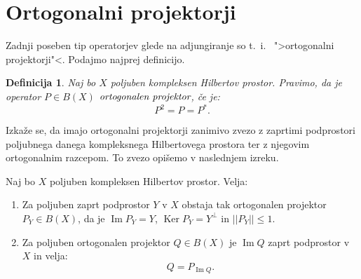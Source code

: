 \documentclass[12pt,a4paper,oneside,fleqn,openany]{book}
\newtheorem{definicija}[izrek]{Definicija}
\newcommand{\abs}[1]{\ensuremath{\lvert #1 \rvert}}
\newcommand{\norm}[1]{\abs{\abs{#1}}}
\newcommand{\pojem}[1]{\ensuremath{\emph{#1}}}
\begin{document}
\section[Ortogonalni projektorji]{Ortogonalni projektorji}
Zadnji poseben tip operatorjev glede na adjungiranje so t.~i.~ ">ortogonalni projektorji"<. Podajmo najprej definicijo.
\begin{definicija}
	\label{def:ortproj}
	Naj bo $X$ poljuben kompleksen Hilbertov prostor. Pravimo, da je operator $P\in B(X)$ \pojem{ortogonalen projektor}, če je: $$P^2 = P = P^*.$$
\end{definicija}
Izkaže se, da imajo ortogonalni projektorji zanimivo zvezo z zaprtimi podprostori poljubnega danega kompleksnega Hilbertovega prostora ter z njegovim ortogonalnim razcepom. To zvezo opišemo v naslednjem izreku.
\begin{izrek}
	\label{izr:ortogprojdekomp}
	Naj bo $X$ poljuben kompleksen Hilbertov prostor. Velja: \begin{enumerate}
		\item Za poljuben zaprt podprostor $Y$ v $X$ obstaja tak ortogonalen projektor $P_Y\in B(X)$, da je $\operatorname{Im}P_Y = Y$, $\operatorname{Ker}P_Y = Y^\bot$ in $\norm{P_Y} \leq 1$.
		\item Za poljuben ortogonalen projektor $Q\in B(X)$ je $\operatorname{Im}Q$ zaprt podprostor v $X$ in velja: $$Q = P_{\operatorname{Im}Q}.$$
	\end{enumerate}
\end{izrek}
\end{document}

